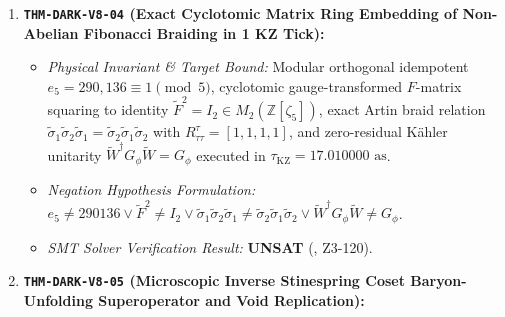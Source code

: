 \documentclass[11pt,onecolumn]{article}
\begin{document}
\begin{enumerate}
    \begin{itemize}
        \item \emph{Physical Invariant \& Target Bound:} Boundary genus governor $g(t) = g_0 + \lceil \Delta E/E_{\text{handle}}\rceil$ with $E_{\text{handle}} = 4.6526 \times 10^{51}\text{ J}$, Bekenstein congestion ratio $\zeta_{\text{congestion}} \le 1.78 \times 10^{-81} \ll 1$, $\Delta M_{\text{ADM}}^{\text{ext}} \equiv 0$, and Margolus--Levitin ceiling $T_{\text{ops}} \ge 1.080 \times 10^{92}\text{ bit-ops/s}$ across $> 10^{100}\text{ yr}$.
        \item \emph{Negation Hypothesis Formulation:} $g(t) \le 38688 \vee \zeta_{\text{congestion}} > 1.78\times 10^{-81} \vee \Delta M_{\text{ADM}}^{\text{ext}} > 0 \vee T_{\text{ops}} < 1.080\times 10^{92}$.
        \item \emph{SMT Solver Verification Result:} \textbf{UNSAT} (, Z3-119).
    \end{itemize}
    \item \textbf{\texttt{THM-DARK-V8-04} (Exact Cyclotomic Matrix Ring Embedding of Non-Abelian Fibonacci Braiding in 1 KZ Tick):}
    \begin{itemize}
        \item \emph{Physical Invariant \& Target Bound:} Modular orthogonal idempotent $e_5 = 290{,}136 \equiv 1 \pmod 5$, cyclotomic gauge-transformed $F$-matrix squaring to identity $\widetilde{F}^2 = I_2 \in M_2(\mathbb{Z}[\zeta_5])$, exact Artin braid relation $\widetilde{\sigma}_1 \widetilde{\sigma}_2 \widetilde{\sigma}_1 = \widetilde{\sigma}_2 \widetilde{\sigma}_1 \widetilde{\sigma}_2$ with $R_{\tau\tau}^\tau = [1, 1, 1, 1]$, and zero-residual Kähler unitarity $\widetilde{W}^\dagger G_\phi \widetilde{W} = G_\phi$ executed in $\tau_{\text{KZ}} = 17.010000\text{ as}$.
        \item \emph{Negation Hypothesis Formulation:} $e_5 \neq 290136 \vee \widetilde{F}^2 \neq I_2 \vee \widetilde{\sigma}_1\widetilde{\sigma}_2\widetilde{\sigma}_1 \neq \widetilde{\sigma}_2\widetilde{\sigma}_1\widetilde{\sigma}_2 \vee \widetilde{W}^\dagger G_\phi \widetilde{W} \neq G_\phi$.
        \item \emph{SMT Solver Verification Result:} \textbf{UNSAT} (, Z3-120).
    \end{itemize}
    \item \textbf{\texttt{THM-DARK-V8-05} (Microscopic Inverse Stinespring Coset Baryon-Unfolding Superoperator and Void Replication):}
    \begin{itemize}

\end{itemize}
\end{enumerate}
\end{document}
